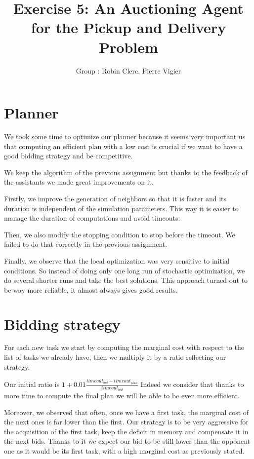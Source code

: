 \documentclass[11pt]{article}
\title{\bf Exercise 5: An Auctioning Agent for the Pickup and Delivery Problem}
\author{Group \textnumero 3: Robin Clerc, Pierre Vigier}
\begin{document}
\maketitle

\section{Planner}

We took some time to optimize our planner because it seems very important us that computing an efficient plan with a low cost is crucial if we want to have a good bidding strategy and be competitive. 

We keep the algorithm of the previous assignment but thanks to the feedback of the assistants we made great improvements on it.

Firstly, we improve the generation of neighbors so that it is faster and its duration is independent of the simulation parameters. This way it is easier to manage the duration of computations and avoid timeouts.

Then, we also modify the stopping condition to stop before the timeout. We failed to do that correctly in the previous assignment.

Finally, we observe that the local optimization was very sensitive to initial conditions. So instead of doing only one long run of stochastic optimization, we do several shorter runs and take the best solutions. This approach turned out to be way more reliable, it almost always gives good results.

\section{Bidding strategy}

For each new task we start by computing the marginal cost with respect to the list of tasks we already have, then we multiply it by a ratio reflecting our strategy.

Our initial ratio is $1+0.01 \frac{timeout_{bid}-timeout_{plan}}{timeout_{bid}}$ Indeed we consider that thanks to more time to compute the final plan we will be able to be even more efficient.

Moreover, we observed that often, once we have a first task, the marginal cost of the next ones is far lower than the first. Our strategy is to be very aggressive for the acquisition of the first task, keep the deficit in memory and compensate it in the next bids. Thanks to it we expect our bid to be still lower than the opponent one as it would be its first task, with a high marginal cost as previously stated.
\end{document}
